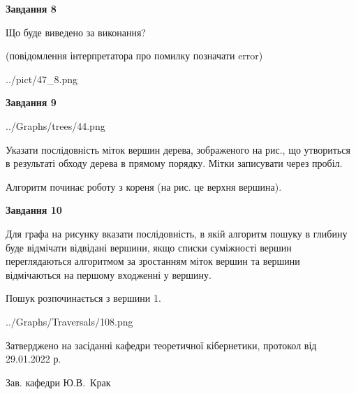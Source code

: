 \documentclass[12pt, ukrainian]{article}
\begin{document}
{\begin {large}
{\begin {center}\textbf{Завдання 8}\end {center}}\par
Що буде виведено за виконання?\par
 (повідомлення інтерпретатора про помилку позначати error)\par
\begin{center}
	{../pict/47_8.png}
\end{center}
\newpage

{\begin {center}\textbf{Завдання 9}\end {center}}\par

\begin{center}
	{../Graphs/trees/44.png}
\end{center}
Указати послідовність міток вершин дерева, зображеного на рис., що утвориться в результаті обходу дерева в прямому порядку. Мітки записувати через пробіл.\par Алгоритм починає роботу з кореня (на рис. це верхня вершина).\par
\newpage

{\begin {center}\textbf{Завдання 10}\end {center}}\par
Для графа на рисунку вказати послідовність, в якій алгоритм пошуку в глибину буде відмічати відвідані вершини, якщо списки суміжності вершин переглядаються алгоритмом за зростанням міток вершин та вершини відмічаються на першому вход\-женні у вершину.\par
Пошук розпочинається з вершини 1.\par

\begin{center}
	{../Graphs/Traversals/108.png}
\end{center}\par
\newpage


\end {large}
}
{\smallskip \begin {small} Затверджено на засіданні кафедри теоретичної кібернетики, протокол  від   29.01.2022 р.\par\smallskip\smallskip
{\parbox {6.5 cm}{Зав. кафедри \dotfill Ю.В.~Крак}} \end{small}}
\end{document}
